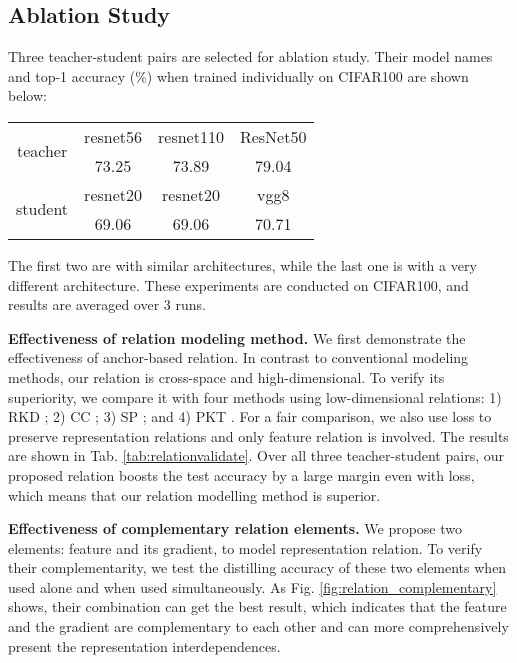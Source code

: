 \documentclass[final]{cvpr}
\begin{document}
\subsection{Ablation Study}
\label{ablation}
 Three  teacher-student pairs are selected  for ablation study. Their model names and 
top-1 accuracy (\%) when trained individually on CIFAR100 are shown below:
\begin{table}[h]
    \centering
    \small
\begin{tabular}{c|cc|c}
\toprule
\multirow{2}{*}{teacher}   & resnet56 &resnet110 &  ResNet50 \\
   & 73.25 & 73.89 & 79.04 \\ 
  \midrule 
\multirow{2}{*}{student}  & resnet20 & resnet20 & vgg8\\
   & 69.06 & 69.06 & 70.71 \\
\bottomrule
\end{tabular}


\end{table}

\noindent The first two are with similar architectures, while the last one is with a  very different architecture. 
 These experiments are conducted on CIFAR100, and results are averaged over 3 runs. 


\noindent \textbf{Effectiveness of relation modeling method.}
\label{exp_relation}
We first demonstrate the effectiveness of anchor-based relation. In contrast to conventional modeling methods, our relation is cross-space and high-dimensional. To verify its superiority, we compare it with four methods using low-dimensional relations:
1) RKD \cite{park2019relational}; 2) CC \cite{peng2019correlation}; 3) SP \cite{tung2019similarity}; and 4) PKT \cite{pkt}.
For a fair comparison, we also use  loss to preserve representation relations and only feature relation is involved.
The results are shown in Tab. \ref{tab:relationvalidate}. 
Over all three teacher-student pairs, our proposed relation  boosts the test accuracy by a large margin even with  loss, which means that our relation modelling method is superior. 

\noindent \textbf{Effectiveness of complementary relation elements.}
We propose two elements: feature  and its gradient, to model representation relation.
To verify  their  complementarity, we test the  distilling  accuracy of these two elements when used alone and when used simultaneously.
As Fig. \ref{fig:relation_complementary} shows, their combination can get the best result, which indicates that the feature and the gradient
are complementary to each other and can more comprehensively present the representation interdependences.
\end{document}

